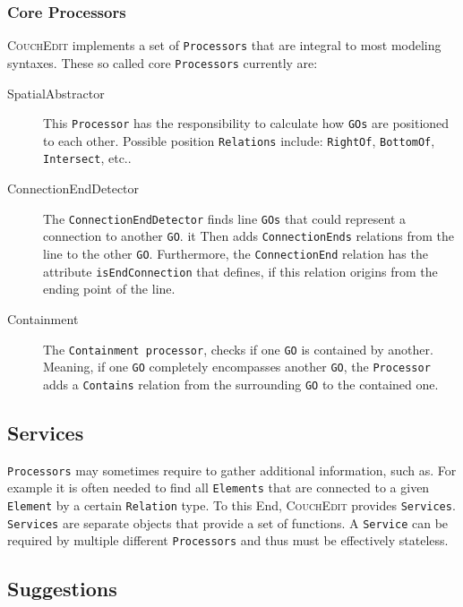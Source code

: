 \subsubsection{Core Processors}
\label{sec:core-processors}
\textsc{CouchEdit} implements a set of \texttt{Processors} that are integral to most modeling syntaxes. These so called core \texttt{Processors} currently are: 
\begin{description}
  \item[SpatialAbstractor] This \texttt{Processor} has the responsibility to calculate how \texttt{GOs} are positioned to each other. Possible position \texttt{Relations} include: \texttt{RightOf}, \texttt{BottomOf}, \texttt{Intersect}, etc..
  \item[ConnectionEndDetector] The \texttt{ConnectionEndDetector} finds line \texttt{GOs} that could represent a connection to another \texttt{GO}. it Then adds \texttt{ConnectionEnds} relations from the line to the other \texttt{GO}. Furthermore, the \texttt{ConnectionEnd} relation has the attribute \texttt{isEndConnection} that defines, if this relation origins from the ending point of the line.
  \item[Containment] The \texttt{Containment processor}, checks if one \texttt{GO} is contained by another. Meaning, if one \texttt{GO} completely encompasses another \texttt{GO}, the \texttt{Processor} adds a \texttt{Contains} relation from the surrounding \texttt{GO} to the contained one.
\end{description}

\subsection{Services}
\label{sec:services}
\texttt{Processors} may sometimes require to gather additional information, such as. For example it is often needed to find all \texttt{Elements} that are connected to a given \texttt{Element} by a certain \texttt{Relation} type.
To this End, \textsc{CouchEdit} provides \texttt{Services}. \texttt{Services} are separate objects that provide a set of functions. A \texttt{Service} can be required by multiple different \texttt{Processors} and thus must be effectively stateless.



\subsection{Suggestions}
